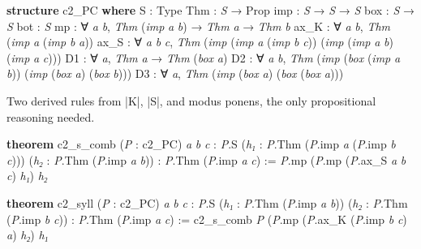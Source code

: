 \documentclass{memoir}
\begin{document}
\begin{LeanVerbatim}
\textbf{structure} c2_PC \textbf{where}
  S : Type
  Thm : \textit{S} → Prop
  imp : \textit{S} → \textit{S} → \textit{S}
  box : \textit{S} → \textit{S}
  bot : \textit{S}
  mp : ∀ \textit{a} \textit{b}, \textit{Thm} (\textit{imp} \textit{a} \textit{b}) → \textit{Thm} \textit{a} → \textit{Thm} \textit{b}
  ax_K : ∀ \textit{a} \textit{b}, \textit{Thm} (\textit{imp} \textit{a} (\textit{imp} \textit{b} \textit{a}))
  ax_S : ∀ \textit{a} \textit{b} \textit{c},
    \textit{Thm} (\textit{imp} (\textit{imp} \textit{a} (\textit{imp} \textit{b} \textit{c})) (\textit{imp} (\textit{imp} \textit{a} \textit{b}) (\textit{imp} \textit{a} \textit{c})))
  D1 : ∀ \textit{a}, \textit{Thm} \textit{a} → \textit{Thm} (\textit{box} \textit{a})
  D2 : ∀ \textit{a} \textit{b}, \textit{Thm}
      (\textit{imp} (\textit{box} (\textit{imp} \textit{a} \textit{b})) (\textit{imp} (\textit{box} \textit{a}) (\textit{box} \textit{b})))
  D3 : ∀ \textit{a}, \textit{Thm} (\textit{imp} (\textit{box} \textit{a}) (\textit{box} (\textit{box} \textit{a})))

\end{LeanVerbatim}


Two derived rules from \LeanVerb|K|, \LeanVerb|S|, and modus ponens, the only propositional
reasoning needed.

\begin{LeanVerbatim}
\textbf{theorem} c2_s_comb (\textit{P} : c2_PC) \textit{a} \textit{b} \textit{c} : \textit{P}.S
    (\textit{h₁} : \textit{P}.Thm (\textit{P}.imp \textit{a} (\textit{P}.imp \textit{b} \textit{c})))
    (\textit{h₂} : \textit{P}.Thm (\textit{P}.imp \textit{a} \textit{b})) :
    \textit{P}.Thm (\textit{P}.imp \textit{a} \textit{c}) :=
  \textit{P}.mp (\textit{P}.mp (\textit{P}.ax_S \textit{a} \textit{b} \textit{c}) \textit{h₁}) \textit{h₂}

\textbf{theorem} c2_syll (\textit{P} : c2_PC) \textit{a} \textit{b} \textit{c} : \textit{P}.S
    (\textit{h₁} : \textit{P}.Thm (\textit{P}.imp \textit{a} \textit{b})) (\textit{h₂} : \textit{P}.Thm (\textit{P}.imp \textit{b} \textit{c})) :
    \textit{P}.Thm (\textit{P}.imp \textit{a} \textit{c}) :=
  c2_s_comb \textit{P} (\textit{P}.mp (\textit{P}.ax_K (\textit{P}.imp \textit{b} \textit{c}) \textit{a}) \textit{h₂}) \textit{h₁}

\end{LeanVerbatim}
\end{document}

